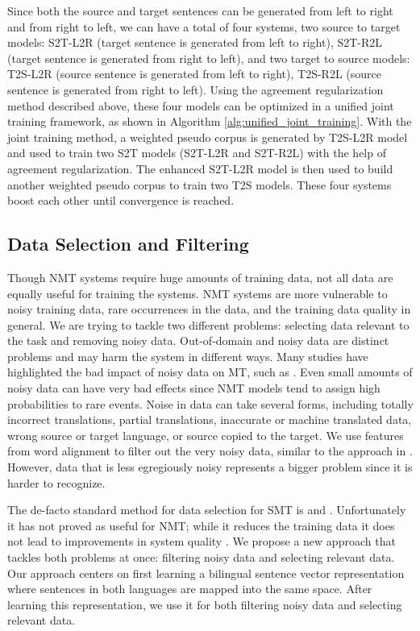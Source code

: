 \documentclass[a4paper]{article}
\begin{document}
\begin{CJK*}{UTF8}{gbsn}
Since both the source and target sentences can be generated from left to right and from right to left, we can have a total of four systems, two source to target models: S2T-L2R (target sentence is generated from left to right), S2T-R2L (target sentence is generated from right to left), and two target to source models: T2S-L2R (source sentence is generated from left to right), T2S-R2L (source sentence is generated from right to left). Using the agreement regularization method described above, these four models can be optimized in a unified joint training framework, as shown in Algorithm \ref{alg:unified_joint_training}. With the joint training method, a weighted pseudo corpus is generated by T2S-L2R model and used to train two S2T models (S2T-L2R and S2T-R2L) with the help of agreement regularization. The enhanced S2T-L2R model is then used to build another weighted pseudo corpus to train two T2S models. These four systems boost each other until convergence is reached. 

\subsection{Data Selection and Filtering}
\label{sec.ds}
Though NMT systems require huge amounts of training data,  not all data are equally useful for training the systems.
NMT systems are more vulnerable to noisy training data, rare occurrences in the data, and the training data quality in general.  We are trying to tackle two different problems: selecting data relevant  to the task and removing noisy data. Out-of-domain and noisy data are distinct problems and may harm the system in different ways. Many studies have highlighted the bad impact of noisy data on MT, such as \cite{noisyNMT}. Even small amounts of noisy data can have very bad effects since NMT models tend to assign high probabilities to rare events. Noise in data can take several forms, including totally incorrect translations, partial translations, inaccurate or machine translated data, wrong source or target language, or source copied to the target. We use  features from word alignment to filter out the very noisy data, similar to the approach in \cite{datagen}. However, data that is less egregiously noisy  represents a bigger problem since it is harder to recognize.

The de-facto standard method for data selection for SMT is \cite{Moorelewis} and \cite{Axelrod}. Unfortunately it has not proved as useful for NMT; while it reduces the training data it does not lead to improvements in system quality \cite{ds_nmt}.  We propose a new approach that tackles both problems at once: filtering noisy data and selecting relevant data. Our approach centers on first learning a bilingual sentence vector representation where sentences in both languages are mapped into the same space. After learning this representation, we use it for both  filtering noisy data and selecting relevant data.


\end{CJK*}
\end{document}

